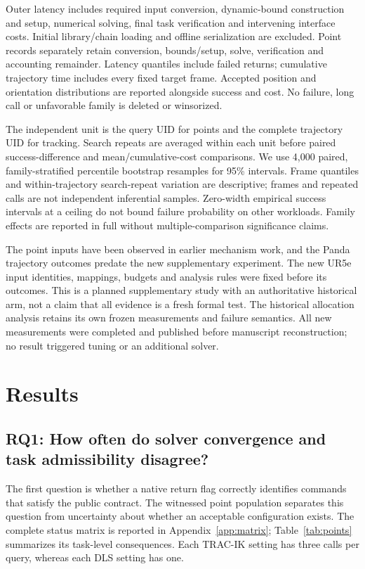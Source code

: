 \documentclass[10pt,a4paper]{article}
\begin{document}
Outer latency includes required input conversion, dynamic-bound construction
and setup, numerical solving, final task verification and intervening interface
costs. Initial library/chain loading and offline serialization are excluded.
Point records separately retain conversion, bounds/setup, solve, verification
and accounting remainder. Latency quantiles include failed returns; cumulative
trajectory time includes every fixed target frame.
Accepted position and orientation distributions are reported alongside success
and cost. No failure, long call or unfavorable family is deleted or winsorized.

The independent unit is the query UID for points and the complete trajectory UID
for tracking. Search repeats are averaged within each unit before paired
success-difference and mean/cumulative-cost comparisons.
We use 4,000 paired, family-stratified percentile bootstrap resamples for
95\% intervals. Frame quantiles and within-trajectory search-repeat variation
are descriptive; frames and repeated calls are not independent inferential
samples. Zero-width empirical success intervals at a ceiling do not bound
failure probability on other workloads. Family effects are reported in full
without multiple-comparison significance claims.

The point inputs have been observed in earlier mechanism work, and the Panda
trajectory outcomes predate the new supplementary experiment.
The new UR5e input identities, mappings, budgets and analysis rules were fixed
before its outcomes. This is a planned supplementary study with an authoritative
historical arm, not a claim that all evidence is a fresh formal test.
The historical allocation analysis retains its own frozen measurements and
failure semantics. All new measurements were completed and published before
manuscript reconstruction; no result triggered tuning or an additional solver.

\section{Results}
\label{sec:results}

\subsection{RQ1: How often do solver convergence and task admissibility disagree?}
\label{sec:rq1}

The first question is whether a native return flag correctly identifies commands
that satisfy the public contract. The witnessed point population separates this
question from uncertainty about whether an acceptable configuration exists.
The complete status matrix is reported in Appendix~\ref{app:matrix};
Table~\ref{tab:points} summarizes its task-level consequences. Each TRAC-IK
setting has three calls per query, whereas each DLS setting has one.
\end{document}
